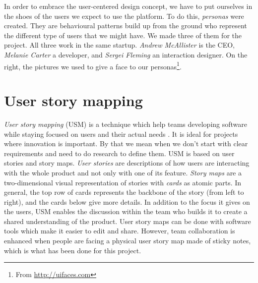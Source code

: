 \documentclass[a4paper,12pt,twoside]{article}
\begin{document}
\begin{figure}
    \hfill
    \begin{subfigure}[t]{1.8cm}
        \centering
    \end{subfigure}
    \label{fig.personas}
\end{figure}

In order to embrace the user-centered design concept, we have to put ourselves in the shoes of the users we expect to use the platform. To do this, \emph{personas} were created.
They are behavioural patterns build up from the ground who represent the different type of users that we might have.
We made three of them for the project.
All three work in the same startup. \emph{Andrew McAllister} is the CEO, \emph{Melanie Carter} a developer, and \emph{Sergei Fleming} an interaction designer.
On the right, the pictures we used to give a face to our personas\footnote{From \url{http://uifaces.com}}.

\section{User story mapping}
\emph{User story mapping} (USM) is a technique which help teams developing software while staying focused on users and their actual needs \cite{patton2014user}.
It is ideal for projects where innovation is important.
By that we mean when we don't start with clear requirements and need to do research to define them.
USM is based on user stories and story maps. \emph{User stories} are descriptions of how users are interacting with the whole product and not only with one of its feature.
\emph{Story maps} are a two-dimensional visual representation of stories with \emph{cards} as atomic parts.
In general, the top row of cards represents the backbone of the story (from left to right), and the cards below give more details.
In addition to the focus it gives on the users, USM enables the discussion within the team who builds it to create a shared understanding of the product.
User story maps can be done with software tools which make it easier to edit and share.
However, team collaboration is enhanced when people are facing a physical user story map made of sticky notes, which is what has been done for this project.
\end{document}
